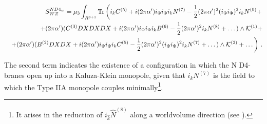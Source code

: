 \documentclass[12pt,a4paper]{article}
\begin{document}
\begin{eqnarray}
\label{actionD4w}
&&S^{ND4_w}_{WZ}=\mu_3\int_{R^{3+1}}{\rm Tr}\left(i_k C^{(5)}+
i(2\pi\alpha^\prime) i_\Phi i_\Phi i_k N^{(7)}-\frac12
(2\pi\alpha^\prime)^2 (i_\Phi i_\Phi)^2 i_k N^{(9)}+\right.
\nonumber\\
&&+(2\pi\alpha^\prime)(C^{(3)}DXDXDX+i(2\pi\alpha^\prime)
i_\Phi i_\Phi i_k B^{(6)}-\frac12 (2\pi\alpha^\prime)^2 i_k N^{(8)}
+\dots)\wedge {\cal K}^{(1)}+\nonumber\\
&&\left.+(2\pi\alpha^\prime)(B^{(2)}DXDX+i(2\pi\alpha^\prime)
i_\Phi i_\Phi i_k C^{(5)}-\frac12 (2\pi\alpha^\prime)^2 
(i_\Phi i_\Phi)^2 i_k N^{(7)}+\dots)\wedge {\cal K}^{(2)}+
\dots\right)\, .\nonumber\\
\end{eqnarray}

\noindent The second term indicates the existence of a
configuration in which the N D4-branes open up into a Kaluza-Klein
monopole, given that
$i_k N^{(7)}$ is the field to which
the Type IIA monopole couples minimally\footnote{It
arises in the reduction of $i_{\hat k}{\hat N}^{(8)}$ along
a worldvolume direction (see \cite{BEL}).}. 
\end{document}
